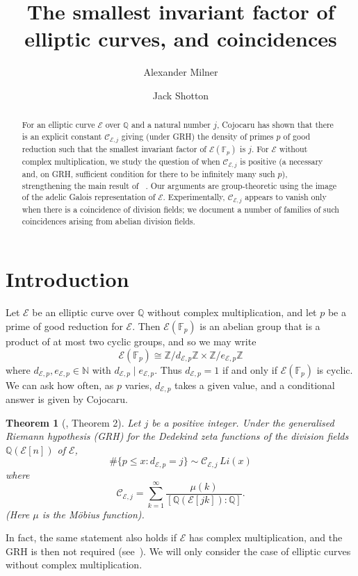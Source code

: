 \documentclass{amsart}
\title{The smallest invariant factor of elliptic curves, and coincidences}
\author{Alexander Milner}
\author{Jack Shotton}
\theoremstyle{plain}
\newtheorem{theorem}{Theorem}[section]
\theoremstyle{remark}
\newcommand{\F}{\mathbb{F}}
\newcommand{\N}{\mathbb{N}}
\newcommand{\Q}{\mathbb{Q}}
\newcommand{\Z}{\mathbb{Z}}
\newcommand{\E}{\mathcal{E}}
\newcommand{\Cc}{\mathcal{C}}
\begin{document}
\begin{abstract}
  For an elliptic curve $\E$ over $\Q$ and a natural number $j$, Cojocaru has shown that there is an explicit constant
  $\Cc_{\E,j}$ giving (under GRH) the density of primes $p$ of good reduction such that the smallest invariant factor of
  $\E(\F_p)$ is $j$. For $\E$ without complex multiplication, we study the question of when $\Cc_{\E,j}$ is positive (a
  necessary and, on GRH, sufficient condition for there to be infinitely many such $p$), strengthening the main result of
  ~\cite{Kim}. Our arguments are group-theoretic using the image of the adelic Galois representation of
  $\E$. Experimentally, $\Cc_{\E,j}$ appears to vanish only when there is a coincidence of division fields; we document
  a number of families of such coincidences arising from abelian division fields.
\end{abstract}
\maketitle
\section{Introduction}
\label{sec:introim}
Let $\E$ be an elliptic curve over $\Q$ without complex multiplication, and let $p$ be a prime of good reduction for
$\E$. Then $\E(\F_p)$ is an abelian group that is a product of at most two cyclic groups, and so we may write
\[\E(\F_p) \cong \Z/d_{\E,p}\Z \times \Z/e_{\E,p}\Z\]
where $d_{\E,p}, e_{\E,p} \in \N$ with $d_{\E,p} \mid e_{\E,p}$. Thus $d_{\E,p} = 1$ if and only if $\E(\F_p)$ is
cyclic. We can ask how often, as $p$ varies, $d_{\E,p}$ takes a given value, and a conditional answer is given by
Cojocaru.

\begin{theorem}[\cite{Co2}, Theorem 2] \label{C2}
    Let $j$ be a positive integer. Under the generalised Riemann hypothesis (GRH) for the Dedekind zeta functions of the division fields $\mathbb{Q}(\E[n])$ of $\E$, 
    \[\#\{p \le x : d_{\E,p}=j\} \sim \mathcal{C}_{\E,j} \, Li(x)\]
    where
    \[\Cc_{\E, j} = \sum_{k=1}^\infty \frac{\mu(k)}{[\Q(\E[jk]):\Q]}.\]
    (Here $\mu$ is the M\"{o}bius function).
\end{theorem}

In fact, the same statement also holds if $\E$ has complex multiplication, and the GRH is then not required (see~\cite{murty_artins_1983}). We will only consider the case of elliptic curves without complex multiplication.
\end{document}
